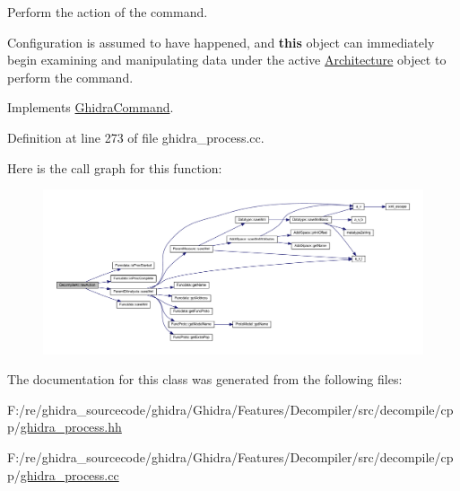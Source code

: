 Perform the action of the command. 

Configuration is assumed to have happened, and {\bfseries{this}} object can immediately begin examining and manipulating data under the active \mbox{\hyperlink{class_architecture}{Architecture}} object to perform the command. 

Implements \mbox{\hyperlink{class_ghidra_command_a7d1a5cfedfd8f1d05161d27627302716}{Ghidra\+Command}}.



Definition at line 273 of file ghidra\+\_\+process.\+cc.

Here is the call graph for this function\+:
\nopagebreak
\begin{figure}[H]
\begin{center}
\leavevmode
\includegraphics[width=350pt]{class_decompile_at_ae5dfee8a7e5fd8343f7cf59e53d4f78c_cgraph}
\end{center}
\end{figure}


The documentation for this class was generated from the following files\+:\begin{DoxyCompactItemize}
\item 
F\+:/re/ghidra\+\_\+sourcecode/ghidra/\+Ghidra/\+Features/\+Decompiler/src/decompile/cpp/\mbox{\hyperlink{ghidra__process_8hh}{ghidra\+\_\+process.\+hh}}\item 
F\+:/re/ghidra\+\_\+sourcecode/ghidra/\+Ghidra/\+Features/\+Decompiler/src/decompile/cpp/\mbox{\hyperlink{ghidra__process_8cc}{ghidra\+\_\+process.\+cc}}\end{DoxyCompactItemize}
